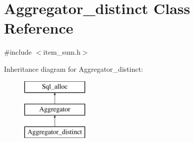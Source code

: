 \hypertarget{classAggregator__distinct}{}\section{Aggregator\+\_\+distinct Class Reference}
\label{classAggregator__distinct}


{\ttfamily \#include $<$item\+\_\+sum.\+h$>$}

Inheritance diagram for Aggregator\+\_\+distinct\+:\begin{figure}[H]
\begin{center}
\leavevmode
\includegraphics[height=3.000000cm]{classAggregator__distinct}
\end{center}
\end{figure}

